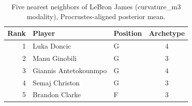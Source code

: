 \begin{table}[htbp]
  \centering\small
  \begin{tabular}{rllc}
    \toprule
    Rank & Player & Position & Archetype \\
    \midrule
    1 & Luka Doncic & G & 4 \\
    2 & Manu Ginobili & G & 3 \\
    3 & Giannis Antetokounmpo & G & 4 \\
    4 & Semaj Christon & G & 3 \\
    5 & Brandon Clarke & F & 3 \\
    \bottomrule
  \end{tabular}
  \caption{Five nearest neighbors of LeBron James (curvature_m3 modality), Procrustes-aligned posterior mean.}
  \label{tab:LeBron_James_neighbors_curvature_m3}
\end{table}

